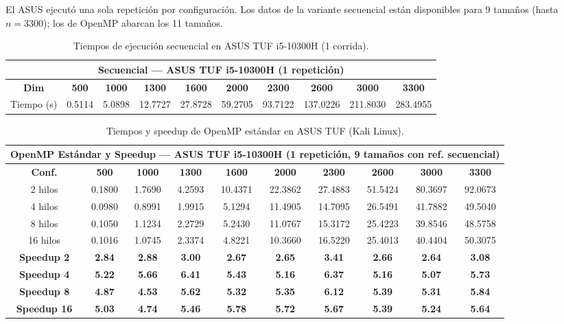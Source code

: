 \documentclass{article}
\begin{document}
El ASUS ejecutó una sola repetición por configuración. Los datos de la variante secuencial están disponibles para 9 tamaños (hasta $n=3300$); los de OpenMP abarcan los 11 tamaños.

\begin{table}[H]
\centering
\tiny
\begin{tabular}{|c|c|c|c|c|c|c|c|c|c|}
\hline
\multicolumn{10}{|c|}{\textbf{Secuencial --- ASUS TUF i5-10300H (1 repetición)}} \\
\hline
\textbf{Dim} & \textbf{500} & \textbf{1000} & \textbf{1300} & \textbf{1600} & \textbf{2000} & \textbf{2300} & \textbf{2600} & \textbf{3000} & \textbf{3300} \\
\hline
Tiempo (s) & 0.5114 & 5.0898 & 12.7727 & 27.8728 & 59.2705 & 93.7122 & 137.0226 & 211.8030 & 283.4955 \\
\hline
\end{tabular}
\caption{Tiempos de ejecución secuencial en ASUS TUF i5-10300H (1 corrida).}
\label{tab:sec_kali}
\end{table}

\begin{table}[H]
\centering
\tiny
\begin{tabular}{|c|c|c|c|c|c|c|c|c|c|}
\hline
\multicolumn{10}{|c|}{\textbf{OpenMP Estándar y Speedup --- ASUS TUF i5-10300H (1 repetición, 9 tamaños con ref. secuencial)}} \\
\hline
\textbf{Conf.} & \textbf{500} & \textbf{1000} & \textbf{1300} & \textbf{1600} & \textbf{2000} & \textbf{2300} & \textbf{2600} & \textbf{3000} & \textbf{3300} \\
\hline
2 hilos & 0.1800 & 1.7690 & 4.2593 & 10.4371 & 22.3862 & 27.4883 & 51.5424 & 80.3697 & 92.0673 \\
4 hilos & 0.0980 & 0.8991 & 1.9915 & 5.1294 & 11.4905 & 14.7095 & 26.5491 & 41.7882 & 49.5040 \\
8 hilos & 0.1050 & 1.1234 & 2.2729 & 5.2430 & 11.0767 & 15.3172 & 25.4223 & 39.8546 & 48.5758 \\
16 hilos & 0.1016 & 1.0745 & 2.3374 & 4.8221 & 10.3660 & 16.5220 & 25.4013 & 40.4404 & 50.3075 \\
\hline
\textbf{Speedup 2} & \textbf{2.84} & \textbf{2.88} & \textbf{3.00} & \textbf{2.67} & \textbf{2.65} & \textbf{3.41} & \textbf{2.66} & \textbf{2.64} & \textbf{3.08} \\
\textbf{Speedup 4} & \textbf{5.22} & \textbf{5.66} & \textbf{6.41} & \textbf{5.43} & \textbf{5.16} & \textbf{6.37} & \textbf{5.16} & \textbf{5.07} & \textbf{5.73} \\
\textbf{Speedup 8} & \textbf{4.87} & \textbf{4.53} & \textbf{5.62} & \textbf{5.32} & \textbf{5.35} & \textbf{6.12} & \textbf{5.39} & \textbf{5.31} & \textbf{5.84} \\
\textbf{Speedup 16} & \textbf{5.03} & \textbf{4.74} & \textbf{5.46} & \textbf{5.78} & \textbf{5.72} & \textbf{5.67} & \textbf{5.39} & \textbf{5.24} & \textbf{5.64} \\
\hline
\end{tabular}
\caption{Tiempos y speedup de OpenMP estándar en ASUS TUF (Kali Linux).}
\label{tab:omp_kali}
\end{table}
\end{document}
